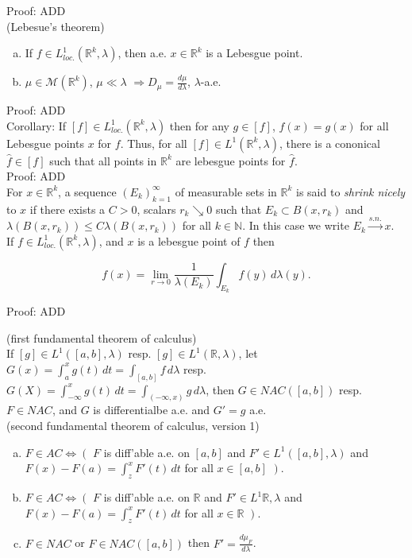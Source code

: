 \documentclass[12pt]{article}
\newcommand{\nats}[0] { \mathbb{N}}
\newcommand{\reals}[0] { \mathbb{R}}
\newcommand{\M}[0] { \mathcal{M} }
\newcommand{\rimply}[0] { \Rightarrow }
\newcommand{\lrimply}[0] { \Leftrightarrow }
\newcommand{\rarw}[0] { \rightarrow }
\begin{document}
\noindent
Proof: ADD \\



(Lebesue's theorem)
\begin{enumerate}[a)]
\item
If $f \in L^1_{loc.}(\reals^k, \lambda)$, then a.e. $x \in \reals^k$ is a Lebesgue point.
\item 
$\mu \in \M(\reals^k)$, $\mu \ll \lambda$ $\rimply D_\mu = \frac{d\mu}{d\lambda}$, $\lambda$-a.e.
\end{enumerate}


\noindent
Proof: ADD \\

Corollary:
If $[f] \in L^1_{loc.}(\reals^k, \lambda)$ then for any $g \in [f]$, $f(x) = g(x)$ for all Lebesgue points $x$ for $f$. Thus, for all $[f] \in L^1(\reals^k, \lambda)$, there is a cononical $\hat{f} \in [f]$ such that all points in $\reals^k$ are lebesgue points for $\hat{f}$.     \\

\noindent
Proof: ADD \\




For $x \in \reals^k$, a sequence $(E_k)_{k=1}^\infty$ of measurable sets in $\reals^k$ is said to \emph{shrink nicely} to $x$ if there exists a $C>0$, scalars $r_k \searrow 0$ such that $E_k \subset B(x, r_k)$ and $ \lambda(B(x,r_k)) \le C \lambda(B(x, r_k))$ for all $k \in \nats$. In this case we write $E_k \overset{s.n.}{\rarw} x$. \\

If $f \in L^1_{loc.}(\reals^k, \lambda)$, and $x$ is a lebesgue point of $f$ then 

$$
f(x) = \lim_{r \rarw 0} \frac{1}{ \lambda(E_k)} \int_{E_k} f(y) \, d \lambda(y).
$$

\noindent
Proof: ADD \\


\break


(first fundamental theorem of calculus)  \\

\noindent
If $[g] \in L^1([a,b], \lambda )$ resp. $[g] \in L^1(\reals, \lambda)$, let $G(x) = \int_a^x g(t) \, dt = \int_{[a,b]} f \, d\lambda$ resp. $G(X) = \int_{-\infty}^x g(t) \, dt = \int_{(-\infty,x)} g \, d\lambda$, then $G \in NAC([a,b])$ resp. $F \in NAC$, and $G$ is differentialbe a.e. and $G' = g$ a.e. \\

(second fundamental theorem of calculus, version 1)
\begin{enumerate}[a)]
\item
$F \in AC \lrimply \left( \right.$  $F$ is diff'able a.e. on $[a,b]$ and $F' \in L^1([a,b], \lambda)$ and $F(x) - F(a) = \int_z^x F'(t)\, dt$ for all $x \in [a,b]$ $\left. \right)$.
\item
$F \in AC \lrimply \left( \right.$  $F$ is diff'able a.e. on $\reals$ and $F' \in L^1{\reals, \lambda}$ and $F(x) - F(a) = \int_z^x F'(t)\, dt$ for all $x \in \reals$ $\left. \right)$.
\item
$F \in NAC$ or $F \in NAC([a,b])$ then $F' = \frac{d\mu_F}{d\lambda}$.
\end{enumerate}
\end{document}
